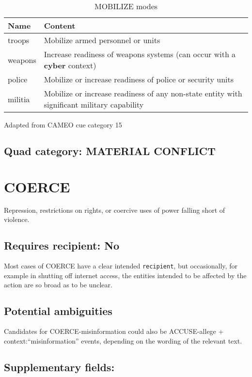 \documentclass[11pt]{report}
\newcommand{\plcat}[1]{\textsf{#1}}
\newcommand{\plcon}[1]{\textbf{#1}}
\newcommand{\txt}[1]{\texttt{#1}}
\begin{document}
\begin{table}[htp]
\caption{MOBILIZE modes}
\begin{center}
\begin{tabular}{|l|p{13cm}|}
\hline
Name & Content \\
\hline
troops & Mobilize armed personnel or units\\
weapons & Increase readiness of weapons systems (can occur with a \plcon{cyber} context) \\
police & Mobilize or increase readiness of police or security units\\
militia & Mobilize or increase readiness of any non-state entity with significant military capability\\
\hline
\end{tabular}
\end{center}
\label{tab:mobilizemode}
Adapted from CAMEO cue category 15
\end{table}


\subsection{Quad category: MATERIAL CONFLICT}

\newpage

\section{COERCE}

Repression, restrictions on rights, or coercive uses of power falling short of violence.

\subsection{Requires recipient: No}

Most cases of \plcat{COERCE} have a clear intended \txt{recipient}, but occasionally, for example in shutting off internet access, the entities intended to be affected by the action are so broad as to be unclear.

\subsection{Potential ambiguities}

Candidates for COERCE-misinformation could also be ACCUSE-allege + context:``misinformation'' events, depending on the wording of the relevant text.

\subsection{Supplementary fields: }
\end{document}
